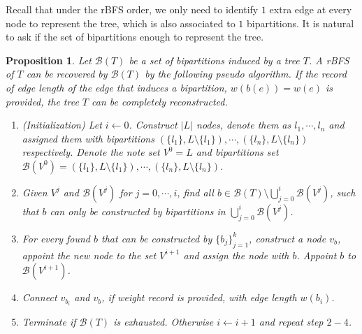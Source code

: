 \documentclass[11pt]{article}
\theoremstyle{definition}
\theoremstyle{remark}
\theoremstyle{plain}
\newtheorem{prop}[defn]{Proposition}
\begin{document}
Recall that under the rBFS order, we only need to identify $1$ extra edge at every node to represent the tree, which is also associated to $1$ bipartitions. It is natural to ask if the set of bipartitions enough to represent the tree.

\begin{prop}
	Let $\mathcal{B}(T)$ be a set of bipartitions induced by a tree $T$. A rBFS of $T$ can be recovered by $\mathcal{B}(T)$ by the following pseudo algorithm.
	If the record of edge length of the edge that induces a bipartition, $w(b(e)) = w(e)$ is provided, the tree $T$ can be completely reconstructed.
	\begin{enumerate}
		\item (Initialization) Let $i\gets0$. Construct $|L|$ nodes, denote them as $l_1,\cdots,l_n$ and assigned them with bipartitions $(\{l_1\},L\setminus \{l_1\}), \cdots, (\{l_n\}, L\setminus\{l_n\})$ respectively. Denote the note set $V^0 = L$ and bipartitions set $\mathcal{B}(V^0) = (\{l_1\},L\setminus \{l_1\}), \cdots, (\{l_n\}, L\setminus\{l_n\})$.
		\item Given $V^j$ and $\mathcal{B}(V^{j})$ for $j = 0, \cdots, i$, find all $b\in \mathcal{B}(T)\setminus \bigcup_{j=0}^i\mathcal{B}(V^j)$, such that $b$ can only be constructed by bipartitions in $\bigcup_{j=0}^i\mathcal{B}(V^j)$.
		\item For every found $b$ that can be constructed by $\{b_j\}_{j=1}^k$, construct a node $v_b$, appoint the new node to the set $V^{i+1}$ and assign the node with $b$. Appoint $b$ to $\mathcal{B}(V^{i+1})$.
		\item Connect $v_{b_i}$ and $v_{b}$, if weight record is provided, with edge length $w(b_i)$.
		\item Terminate if $\mathcal{B}(T)$ is exhausted. Otherwise $i\gets i+1$ and repeat step $2-4$.
	\end{enumerate}

	
\end{prop}
\end{document}
